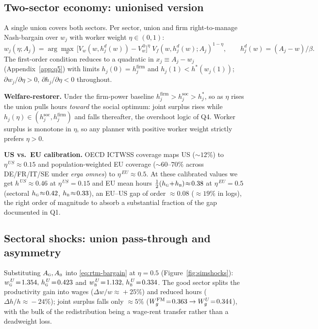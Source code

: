 \documentclass[a4paper,11pt]{article}
\begin{document}
\subsection{Two-sector economy: unionised version}
A single union covers both sectors. Per sector, union and firm right-to-manage Nash-bargain over $w_j$ with worker weight $\eta\!\in\!(0,1)$:
\begin{equation}
w_j(\eta;A_j)=\arg\max_w\, \bigl[V_w(w,h_j^d(w))-V_w^{\,0}\bigr]^{\eta}\; V_f(w,h_j^d(w);A_j)^{1-\eta},\qquad h_j^d(w)=(A_j-w)/\beta.
\label{eq:rtm-bargain}
\end{equation}
The first-order condition reduces to a quadratic in $x_j\!\equiv\!A_j\!-\!w_j$ (Appendix~\ref{app:q5}) with limits $h_j(0)\!=\!h^{\mathrm{firm}}_j$ and $h_j(1)\!<\!h^{*}(w_j(1))$; $\partial w_j/\partial\eta>0$, $\partial h_j/\partial\eta<0$ throughout.

\textbf{Welfare-restorer.} Under the firm-power baseline $h^{\mathrm{firm}}_j\!>\!h^{\mathrm{soc}}_j\!>\!h_j^{*}$, so as $\eta$ rises the union pulls hours \emph{toward} the social optimum: joint surplus rises while $h_j(\eta)\!\in\!(h^{\mathrm{soc}}_j,h^{\mathrm{firm}}_j)$ and falls thereafter, the overshoot logic of Q4. Worker surplus is monotone in $\eta$, so any planner with positive worker weight strictly prefers $\eta\!>\!0$.

\textbf{US vs.\ EU calibration.} OECD ICTWSS coverage maps US ($\sim\!12\%$) to $\eta^{\,US}\!\approx\!0.15$ and population-weighted EU coverage ($\sim\!60$--$70\%$ across DE/FR/IT/SE under \emph{erga omnes}) to $\eta^{\,EU}\!\approx\!0.5$. At these calibrated values we get $h^{\,US}\!\approx\!0.46$ at $\eta^{\,US}\!=\!0.15$ and EU mean hours $\tfrac{1}{2}(h_{\textsc{g}}\!+\!h_{\textsc{b}})\!\approx\!0.38$ at $\eta^{\,EU}\!=\!0.5$ (sectoral $h_{\textsc{g}}\!\approx\!0.42$, $h_{\textsc{b}}\!\approx\!0.33$), an EU--US gap of order $\approx\!0.08$ ($\approx\!19\%$ in logs), the right order of magnitude to absorb a substantial fraction of the gap documented in Q1.

\subsection{Sectoral shocks: union pass-through and asymmetry}
Substituting $A_{\textsc{g}}, A_{\textsc{b}}$ into \eqref{eq:rtm-bargain} at $\eta\!=\!0.5$ (Figure~\ref{fig:simshocks}): $w_{\textsc{g}}^{\,U}\!=\!1.354,\,h_{\textsc{g}}^{\,U}\!=\!0.423$ and $w_{\textsc{b}}^{\,U}\!=\!1.132,\,h_{\textsc{b}}^{\,U}\!=\!0.334$. The good sector splits the productivity gain into wages ($\Delta w/w\!\approx\!+25\%$) and reduced hours ($\Delta h/h\!\approx\!-24\%$); joint surplus falls only $\approx\!5\%$ ($W_g^{\rm FM}\!=\!0.363\to W_g^{U}\!=\!0.344$), with the bulk of the redistribution being a wage-rent transfer rather than a deadweight loss.
\end{document}
